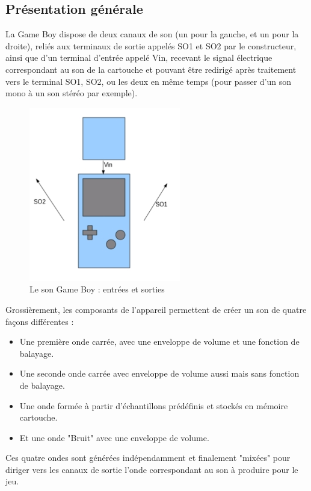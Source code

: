 \documentclass{report}
\begin{document}
\subsection{Présentation générale}
	La Game Boy dispose de deux canaux de son (un pour la gauche,
	et un pour la droite), reliés aux terminaux de sortie appelés
	SO1 et SO2 par le constructeur, ainsi que d'un terminal
	d'entrée appelé Vin, recevant le signal électrique
	correspondant au son de la cartouche et pouvant être redirigé après
	traitement vers le terminal SO1, SO2, ou les deux en même
	temps (pour passer d'un son mono à un son stéréo par
	exemple).
\begin{figure}[!h]
\centering
\includegraphics[scale=0.5]{images/GBSound1.jpg}
\caption{Le son Game Boy : entrées et sorties}
\label{GBS1}
\end{figure}

	Grossièrement, les composants de l'appareil permettent de
	créer un son de quatre façons différentes : 
		\begin{itemize}
		\item Une première onde carrée, avec une enveloppe de
		volume et une fonction de balayage.
		\item Une seconde onde carrée avec enveloppe de volume
		aussi mais sans fonction de balayage.
		\item Une onde formée à partir d'échantillons
		prédéfinis et stockés en mémoire cartouche.
		\item Et une onde "Bruit" avec une enveloppe de
		volume.
		\end{itemize}
	Ces quatre ondes sont générées indépendamment et finalement
	"mixées" pour diriger vers les canaux de sortie l'onde
	correspondant au son à produire pour le jeu.
\end{document}
